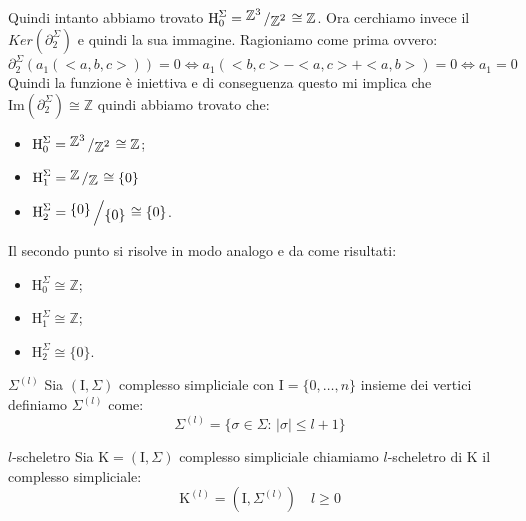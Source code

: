 \documentclass[11pt, a4paper, twoside]{article}
\newcommand{\bigslant}[2]{{\raisebox{.2em}{$#1$}\left/\raisebox{-.2em}{$#2$}\right.}}
\begin{document}
\begin{sol}
	Quindi intanto abbiamo trovato $\text{H}_0^\Sigma=\bigslant{\mathbb{Z}^3}{\mathbb{Z}^2}\cong\mathbb{Z}$.
	Ora cerchiamo invece il $Ker(\partial^\Sigma_2)$ e quindi la sua immagine.
	Ragioniamo come prima ovvero: 
	\[
		\partial^\Sigma_2(a_1(<a,b,c>))=0\iff a_1(<b,c>-<a,c>+<a,b>)=0 \iff a_1=0
	\]
	Quindi la funzione è iniettiva e di conseguenza questo mi implica che $\text{Im}(\partial^\Sigma_2)\cong\mathbb{Z}$ quindi abbiamo trovato che:
	\begin{itemize}
		\item $\text{H}_0^\Sigma=\bigslant{\mathbb{Z}^3}{\mathbb{Z}^2}\cong\mathbb{Z}$;
		\item $\text{H}_1^\Sigma=\bigslant{\mathbb{Z}}{\mathbb{Z}}\cong\{0\}$
		\item $\text{H}_2^\Sigma=\bigslant{\{0\}}{\{0\}}\cong\{0\}$.
	\end{itemize}
	Il secondo punto si risolve in modo analogo e da come risultati:
	\begin{itemize}
		\item $\text{H}_0^\Sigma\cong\mathbb{Z}$;
		\item $\text{H}_1^\Sigma\cong\mathbb{Z}$;
		\item $\text{H}_2^\Sigma\cong\{0\}$.
	\end{itemize}
\end{sol}

\begin{defn}{$\Sigma^{(l)}$}{}
	Sia $(\text{I},\Sigma)$ complesso simpliciale con $\text{I}=\{0,\dots,n\}$ insieme dei vertici definiamo $\Sigma^{(l)}$ come:
	\[
		\Sigma^{(l)}=\{\sigma\in\Sigma:\,|\sigma|\leq l+1\}
	\]
\end{defn}

\begin{defn}{$l$-scheletro}{}
	Sia $\text{K}=(\text{I},\Sigma)$ complesso simpliciale chiamiamo $l$-scheletro di K il complesso simpliciale:
	\[
		\text{K}^{(l)}=(\text{I},\Sigma^{(l)})\quad l\geq 0
	\]
\end{defn}
\end{document}
